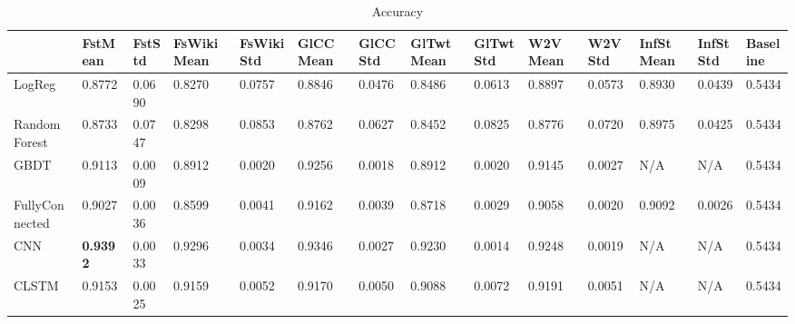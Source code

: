 \begin{table}[]
\centering
\caption{Accuracy}
\label{acc1}
\begin{adjustbox}{width=\textwidth}
\begin{tabular}{@{}llllllllllllll@{}}
\multicolumn{1}{l|}{}                         & \multicolumn{1}{l|}{FstMean} & \multicolumn{1}{l|}{FstStd} & \multicolumn{1}{l|}{FsWikiMean} & \multicolumn{1}{l|}{FsWikiStd} & \multicolumn{1}{l|}{GlCCMean} & \multicolumn{1}{l|}{GlCCStd} & \multicolumn{1}{l|}{GlTwtMean} & \multicolumn{1}{l|}{GlTwtStd} & \multicolumn{1}{l|}{W2VMean} & \multicolumn{1}{l|}{W2VStd} & \multicolumn{1}{l|}{InfStMean} & \multicolumn{1}{l|}{InfStStd} & \multicolumn{1}{l|}{Baseline} \\ \midrule
\multicolumn{1}{|l|}{LogReg}         & 0.8772                    & 0.0690                   & 0.8270                    & 0.0757                   & 0.8846                    & 0.0476                   & 0.8486                    & 0.0613                   & 0.8897                    & 0.0573                   & 0.8930                    & 0.0439                   & 0.5434                        \\ \cmidrule(r){1-1}
\multicolumn{1}{|l|}{Random Forest}   & 0.8733                    & 0.0747                   & 0.8298                    & 0.0853                   & 0.8762                    & 0.0627                   & 0.8452                    & 0.0825                   & 0.8776                    & 0.0720                   & 0.8975                    & 0.0425                   & 0.5434                        \\ \cmidrule(r){1-1}
\multicolumn{1}{|l|}{GBDT}       & 0.9113                    & 0.0009                   & 0.8912                    & 0.0020                   & 0.9256                    & 0.0018                   & 0.8912                    & 0.0020                   & 0.9145                    & 0.0027                   & N/A                       &N/A                          & 0.5434                        \\ \cmidrule(r){1-1}
\multicolumn{1}{|l|}{FullyConnected} & 0.9027                    & 0.0036                   & 0.8599                    & 0.0041                   & 0.9162                    & 0.0039                   & 0.8718                    & 0.0029                   & 0.9058                    & 0.0020                   & 0.9092                    & 0.0026                   & 0.5434                        \\
\cmidrule(r){1-1}
\multicolumn{1}{|l|}{CNN} & {\bf 0.9392} &0.0033 &0.9296 &0.0034 & 0.9346 &0.0027 & 0.9230 &0.0014 & 0.9248 &0.0019 &N/A &N/A & 0.5434 \\
\cmidrule(r){1-1}
\multicolumn{1}{|l|}{CLSTM} & 0.9153 & 0.0025 & 0.9159 & 0.0052 & 0.9170 & 0.0050 & 0.9088 & 0.0072 &0.9191&0.0051&N/A&N/A&0.5434\\
 \bottomrule
\end{tabular}
\end{adjustbox}
\end{table}


